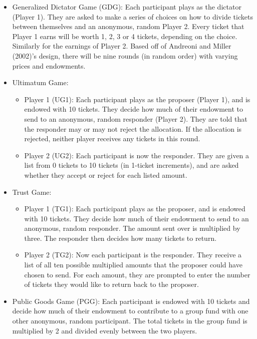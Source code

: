 \documentclass[12pt]{article}
\begin{document}
\begin{itemize}

\item{Generalized Dictator Game (GDG)}:  Each participant plays as the dictator (Player 1). They are asked to make a series of choices on how to divide tickets between themselves and an anonymous, random Player 2. Every ticket that Player 1 earns will be worth 1, 2, 3 or 4 tickets, depending on the choice. Similarly for the earnings of Player 2. Based off of Andreoni and Miller (2002)'s design, there will be nine rounds (in random order) with varying prices and endowments.
\item{Ultimatum Game}: 
	\begin{itemize}
		\item{Player 1 (UG1)}: Each participant plays as the proposer (Player 1), and is endowed with 10 tickets. They decide how much of their endowment to send to an anonymous, random responder (Player 2). They are told that the responder may or may not reject the allocation. If the allocation is rejected, neither player receives any tickets in this round.
		\item{Player 2 (UG2)}: Each participant is now the responder. They are given a list from 0 tickets to 10 tickets (in 1-ticket increments), and are asked whether they accept or reject for each listed amount.
	\end{itemize}
\item{Trust Game}:
	\begin{itemize}
		\item{Player 1 (TG1)}: Each participant plays as the proposer, and is endowed with 10 tickets. They decide how much of their endowment to send to an anonymous, random responder. The amount sent over is multiplied by three. The responder then decides how many tickets to return. 
		\item{Player 2 (TG2)}: Now each participant is the responder. They receive a list of all ten possible multiplied amounts that the proposer could have chosen to send. For each amount, they are prompted to enter the number of tickets they would like to return back to the proposer.
	\end{itemize}
\item{Public Goods Game (PGG)}: Each participant is endowed with 10 tickets and decide how much of their endowment to contribute to a group fund with one other anonymous, random participant. The total tickets in the group fund is multiplied by 2 and divided evenly between the two players.

\end{itemize}
\end{document}
